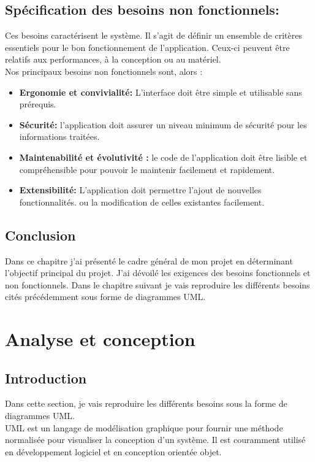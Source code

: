 \documentclass[12pt,a4paper]{report}
\begin{document}
		\section{Spécification des besoins non fonctionnels:}		
Ces besoins caractérisent le système. Il s’agit de définir un ensemble de critères essentiels
pour le bon fonctionnement de l’application. Ceux-ci peuvent être relatifs aux performances, à la
conception ou au matériel.\\
Nos principaux besoins non fonctionnels sont, alors :\\
			\begin{itemize}
				\item \textbf{Ergonomie et convivialité:} L’interface doit être simple et utilisable sans prérequis.
				\item \textbf{Sécurité:} l’application doit assurer un niveau minimum de sécurité pour les
informations traitées.
				\item \textbf{Maintenabilité et évolutivité :} le code de l’application doit être lisible et
compréhensible pour pouvoir le maintenir facilement et rapidement.
				\item \textbf{Extensibilité:} L’application doit permettre l’ajout de nouvelles fonctionnalités.
ou la modification de celles existantes facilement.
				\end{itemize}


		\section{Conclusion}
Dans ce chapitre j'ai présenté le cadre général de mon projet en déterminant l’objectif principal du projet. J'ai dévoilé les exigences des besoins fonctionnels et non fonctionnels. Dans le chapitre suivant je vais reproduire les différents besoins cités précédemment sous forme de diagrammes UML.







	\chapter{Analyse et conception}

		
		\section{Introduction}
Dans cette section, je vais reproduire les différents besoins sous la forme de diagrammes UML.\\
UML est un langage de modélisation graphique pour fournir une méthode normalisée pour visualiser la conception d'un système. Il est couramment utilisé en développement logiciel et en conception orientée objet.
		
\end{document}
